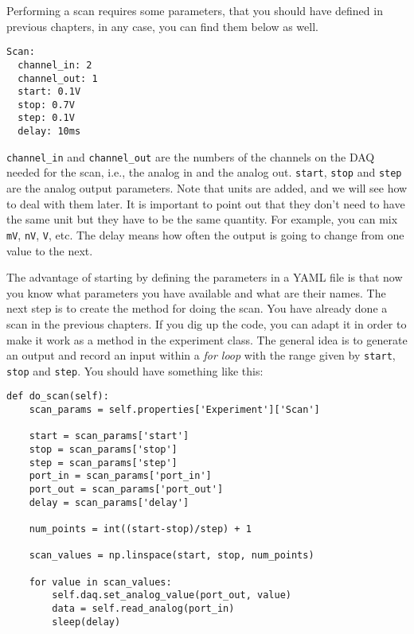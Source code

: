 
Performing a scan requires some parameters, that you should have defined in previous chapters, in any case, you can find them below as well.

\begin{verbatim}
Scan:
  channel_in: 2
  channel_out: 1
  start: 0.1V
  stop: 0.7V
  step: 0.1V
  delay: 10ms
\end{verbatim}

\texttt{channel_in} and \texttt{channel_out} are the numbers of the channels on the DAQ needed for the scan, i.e., the analog in and the analog out. \texttt{start}, \texttt{stop} and \texttt{step} are the analog output parameters. Note that units are added, and we will see how to deal with them later. It is important to point out that they don't need to have the same unit but they have to be the same quantity. For example, you can mix \texttt{mV},  \texttt{nV},  \texttt{V}, etc. The delay means how often the output is going to change from one value to the next.

The advantage of starting by defining the parameters in a {YAML} file is that now you know what parameters you have available and what are their names. The next step is to create the method for doing the scan. You have already done a scan in the previous chapters. If you dig up the code, you can adapt it in order to make it work as a method in the experiment class. The general idea is to
generate an output and record an input within a \emph{for loop} with the range given by \texttt{start}, \texttt{stop} and \texttt{step}. You
should have something like this:

\begin{verbatim}
def do_scan(self):
    scan_params = self.properties['Experiment']['Scan']
    
    start = scan_params['start']
    stop = scan_params['stop']
    step = scan_params['step']
    port_in = scan_params['port_in']
    port_out = scan_params['port_out']
    delay = scan_params['delay']

    num_points = int((start-stop)/step) + 1

    scan_values = np.linspace(start, stop, num_points)

    for value in scan_values:
        self.daq.set_analog_value(port_out, value)
        data = self.read_analog(port_in)
        sleep(delay)
\end{verbatim}

